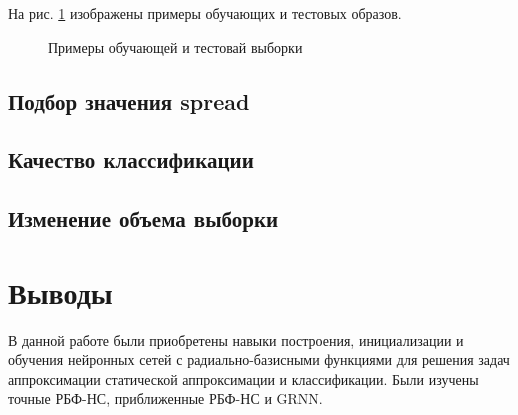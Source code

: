 
На рис. \ref{fig:5_1} изображены примеры обучающих и тестовых образов.
\begin{figure}[H]
\begin{center}
	\caption{Примеры обучающей и тестовай выборки}
	\label{fig:5_1}
\end{center}
\end{figure}

\subsection{Подбор значения spread}


\subsection{Качество классификации}


\subsection{Изменение объема выборки}


\section{Выводы}

В данной работе были приобретены навыки построения, инициализации и обучения нейронных сетей с радиально-базисными функциями для решения задач аппроксимации статической аппроксимации и классификации. Были изучены точные РБФ-НС, приближенные РБФ-НС и GRNN.


